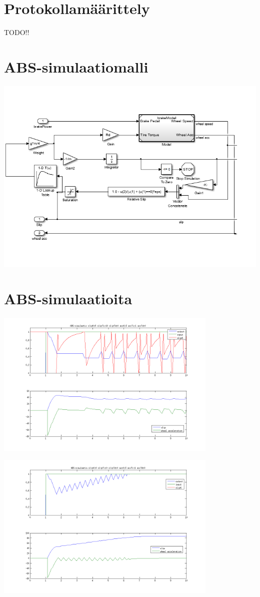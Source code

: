 \documentclass{article}
\newcommand{\kuvaa}[4]{%
	\begin{figure}[h]%
		\centering \texttt{[image: \#2]}%
		\caption{#3 \label{fig:#4}}%
	\end{figure}%
}
\begin{document}
\begin{appendices}
\section{Protokollamäärittely}
TODO!!

\section{ABS-simulaatiomalli} \label{app:simmodel}
{\centering \includegraphics[width=1.0\textwidth]{qrtVehMdl}}

\section{ABS-simulaatioita} \label{app:abssim}
{\centering \includegraphics[width=0.8\textwidth]{abssim1}

 \includegraphics[width=0.8\textwidth]{abssim2}

}
\end{appendices}
\end{document}
